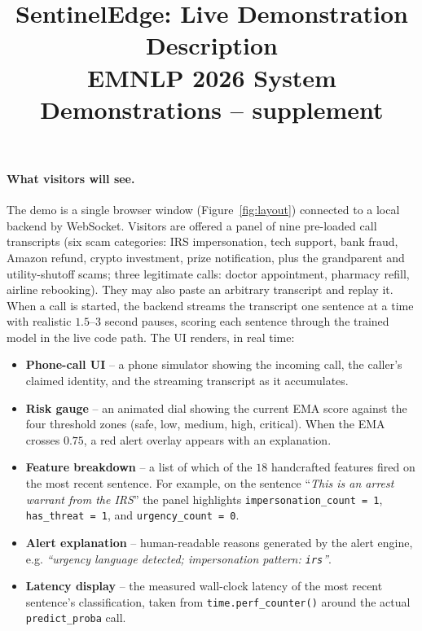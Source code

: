 \documentclass[11pt,a4paper]{article}
\title{\textbf{SentinelEdge: Live Demonstration Description}\\
{\large EMNLP 2026 System Demonstrations -- supplement}}
\author{}
\date{}
\begin{document}
\maketitle
\vspace{-3em}

\paragraph{What visitors will see.}
The demo is a single browser window (Figure~\ref{fig:layout}) connected
to a local backend by WebSocket. Visitors are offered a panel of nine
pre-loaded call transcripts (six scam categories: IRS impersonation,
tech support, bank fraud, Amazon refund, crypto investment, prize
notification, plus the grandparent and utility-shutoff scams; three
legitimate calls: doctor appointment, pharmacy refill, airline
rebooking). They may also paste an arbitrary transcript and replay
it. When a call is started, the backend streams the transcript one
sentence at a time with realistic $1.5$--$3$ second pauses, scoring
each sentence through the trained model in the live code path. The UI
renders, in real time:

\begin{itemize}[leftmargin=*,itemsep=2pt,topsep=2pt]
\item \textbf{Phone-call UI} -- a phone simulator showing the
incoming call, the caller's claimed identity, and the streaming
transcript as it accumulates.
\item \textbf{Risk gauge} -- an animated dial showing the current EMA
score against the four threshold zones (safe, low, medium, high,
critical). When the EMA crosses $0.75$, a red alert overlay appears
with an explanation.
\item \textbf{Feature breakdown} -- a list of which of the $18$
handcrafted features fired on the most recent sentence. For example,
on the sentence ``\textit{This is an arrest warrant from the IRS}'' the
panel highlights \texttt{impersonation\_count = 1},
\texttt{has\_threat = 1}, and \texttt{urgency\_count = 0}.
\item \textbf{Alert explanation} -- human-readable reasons generated
by the alert engine, e.g. \textit{``urgency language detected;
impersonation pattern: \texttt{irs}''}.
\item \textbf{Latency display} -- the measured wall-clock latency of
the most recent sentence's classification, taken from
\texttt{time.perf\_counter()} around the actual
\texttt{predict\_proba} call.
\end{itemize}
\end{document}
